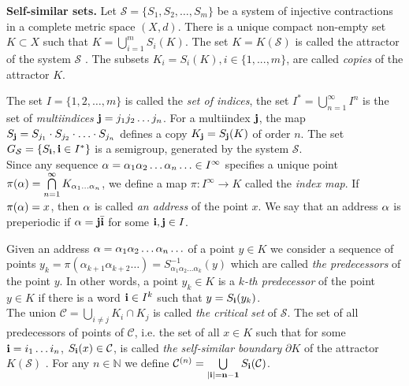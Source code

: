 \documentclass[11pt,reqno]{amsart}
\newcommand{\eS}{{\mathcal S}}
\begin{document}
{\bf Self-similar sets.} Let ${\eS}=\{S_1,  S_2, \ldots,  S_m\}$ be a system of injective contractions in a complete metric space $(X,  d)$. 
There is a unique compact non-empty set  $K{\subset} X$ such that $K =\bigcup\limits_{i = 1}^m S_i (K)$. The set $K=K({\eS})$  is called the attractor of the system  ${\eS}$ \cite{Hut}. The subsets $K_i=S_i(K), i\in\{1,...,m\}$, are called {\em copies} of the attractor $K$. 


The set $I=\{1, 2, \ldots, m\}$ is called the {\em set of indices},  the set $I^*=\bigcup\limits_{n=1}^\infty I^n$ 
is the set of  {\em multiindices} ${\bf {j}}=j_1j_2\ldots j_n$. For a multiindex
${\bf {j}}$, the map $S_{\bf {j}}=S_{j_1}\cdot S_{j_2}\cdot\ldots\cdot S_{j_n}$ defines a copy $K_{\bf {j}}=S_{\bf {j}}(K)$ of order $n$. The set $G_{\eS}=\{S_{\bf {i}},{\bf {i}}\in I^*\}$ is a semigroup, generated by the system ${\eS}$.\\

Since any sequence 
${\bf\alpha}=\alpha_1\alpha_2\ldots\alpha_n\ldots\in I^\infty$ specifies a unique point 
$\pi({\bf\alpha})=\bigcap\limits_{n=1}^\infty K_{\alpha_1\ldots\alpha_n}$,
we define a map
$\pi:I^{\infty}\rightarrow K$  called the {\em index map}.  If $\pi({\bf\alpha})=x$,  then ${\bf\alpha}$ is called {\em an address} of the point $x$.  
 We say that an address ${\bf\alpha}$ is preperiodic if ${\bf\alpha}={\bf {j}}\bar{\bf {i}}$ for some ${\bf {i}},{\bf {j}}\in I$.

Given an address ${\bf\alpha}=\alpha_1\alpha_2\ldots\alpha_n\ldots$ of a point $y\in K$ we consider a sequence of points $y_k=\pi(\alpha_{k+1}\alpha_{k+2}\ldots)= S_{\alpha_1\alpha_2\ldots\alpha_k}^{-1}(y)$ which are called {\em the predecessors} of the point $y$.
In other words, a point $y_k \in K$ is a {\em $k$-th predecessor} of the point $y \in K$ if there is a word ${\bf {i}} \in I^k$ such that $y = S_{{\bf {i}}}(y_k)$.  \\



The union ${\mathcal C}=\bigcup\limits_{i\neq j} K_i\cap K_j$ is called { \em the critical set} of ${\eS}$. 
The set  of all predecessors of points of ${\mathcal C}$, i.e. the set of all  $x\in K$ such that for some ${\bf {i}}=i_1\ldots i_n$, $S_{{\bf {i}}}(x)\in {\mathcal C}$, is called {\em the self-similar boundary} ${\partial} K$ of the attractor $K({\eS})$ \cite{Mor}.
For any $n\in \mathbb{N}$ we define ${\mathcal C}^{(n)} = \bigcup\limits_{|\bf{i}| = n-1} S_{\bf{i}} ({\mathcal C})$.
\end{document}
